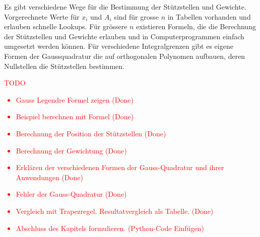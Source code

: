 Es gibt verschiedene Wege für die Bestimmung der Stützstellen und Gewichte.
Vorgerechnete Werte für $x_{i}$ und $A_{i}$ sind für grosse $n$ in Tabellen
vorhanden und erlauben schnelle Lookups. Für grössere $n$ existieren
Formeln, die die Berechnung der Stützstellen und Gewichte erlauben und
in Computerprogrammen einfach umgesetzt werden können.
Für verschiedene Integralgrenzen gibt es eigene Formen der Gaussquadratur
die auf orthogonalen Polynomen aufbauen, deren Nullstellen die Stützstellen
bestimmen.
\textcolor{red}{
    TODO
    \begin{itemize}
        \item Gauss Legendre Formel zeigen (Done)
        \item Beispiel berechnen mit Formel (Done)
        \item Berechnung der Position der Stützstellen (Done)
        \item Berechnung der Gewichtung (Done)
        \item Erklären der verschiedenen Formen der Gauss-Quadratur und ihrer Anwendungen (Done)
        \item Fehler der Gauss-Quadratur (Done)
        \item Vergleich mit Trapezregel. Resultatvergleich als Tabelle. (Done)
        \item Abschluss des Kapitels formulieren. (Python-Code Einfügen)
    \end{itemize}
}






